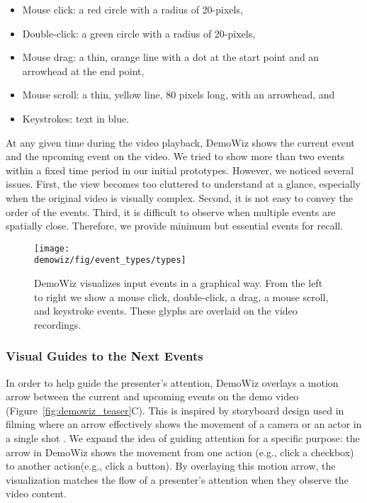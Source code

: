 \begin{itemize}
  \item Mouse click: a red circle with a radius of 20-pixels,
  \item Double-click: a green circle with a radius of 20-pixels,
  \item Mouse drag: a thin, orange line with a dot at the start point and an arrowhead at the end point,
  \item Mouse scroll: a thin, yellow line, 80 pixels long, with an arrowhead, and
  \item Keystrokes: text in blue.
\end{itemize}

At any given time during the video playback, DemoWiz shows the current event and the upcoming event on the video. We tried to show more than two events within a fixed time period in our initial prototypes. However, we noticed several issues. First, the view becomes too cluttered to understand at a glance, especially when the original video is visually complex. Second, it is not easy to convey the order of the events. Third, it is difficult to observe when multiple events are spatially close. Therefore, we provide minimum but essential events for recall.

\begin{figure*}[t]
  \centering
  \texttt{[image: \\demowiz/fig/event\_types/types]}
  \caption{DemoWiz visualizes input events in a graphical way. From the left to right we show a mouse click, double-click, a drag, a mouse scroll, and keystroke events. These glyphs are overlaid on the video recordings.}
  \label{fig:demowiz_glyphs}
\end{figure*}


\subsubsection{Visual Guides to the Next Events}
In order to help guide the presenter's attention, DemoWiz overlays a motion arrow between the current and upcoming events on the demo video (Figure~\ref{fig:demowiz_teaser}C). This is inspired by storyboard design used in filming where an arrow effectively shows the movement of a camera or an actor in a single shot \cite{goldman2006schematic}. We expand the idea of guiding attention for a specific purpose: the arrow in DemoWiz shows the movement from one action (e.g., click a checkbox) to another action(e.g., click a button). By overlaying this motion arrow, the visualization matches the flow of a presenter's attention when they observe the video content.

